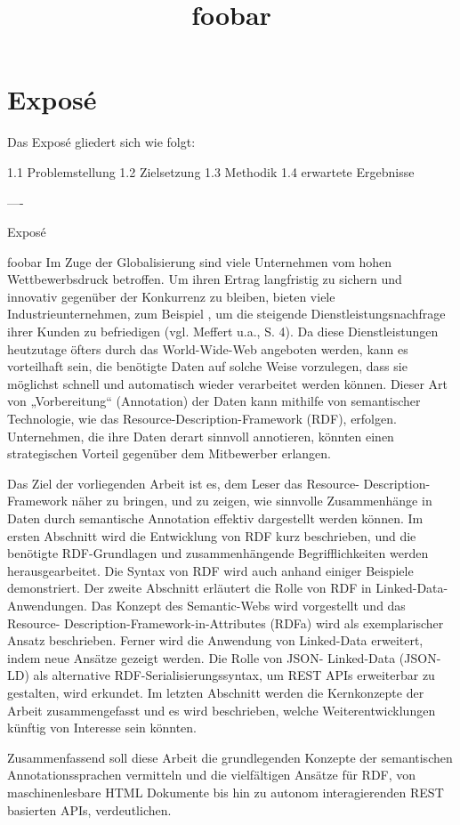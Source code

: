 \documentclass[12pt,
               a4paper,
               twoside=false,
              numbers=noenddot]{scrartcl}
\begin{document}
\title{foobar}
\section{Exposé}
\label{sec:exposé}

Das Exposé gliedert sich wie folgt:  

1.1 Problemstellung
1.2 Zielsetzung
1.3 Methodik
1.4 erwartete Ergebnisse

----

Exposé

\autocite{Wood:14:WNR} foobar
Im Zuge der Globalisierung sind viele Unternehmen vom hohen Wettbewerbsdruck betroffen. Um ihren Ertrag langfristig zu sichern und innovativ gegenüber der Konkurrenz zu bleiben, bieten viele Industrieunternehmen, zum Beispiel , um die steigende Dienstleistungsnachfrage ihrer Kunden zu befriedigen (vgl.
Meffert u.a., S. 4). Da diese Dienstleistungen heutzutage öfters durch das World-Wide-Web angeboten werden, kann es vorteilhaft sein, die benötigte Daten auf solche Weise vorzulegen, dass sie möglichst schnell und automatisch wieder verarbeitet werden können. Dieser Art von „Vorbereitung“ (Annotation) der Daten kann mithilfe von semantischer Technologie, wie das Resource-Description-Framework (RDF), erfolgen. Unternehmen, die ihre Daten derart sinnvoll annotieren, könnten einen strategischen Vorteil gegenüber dem Mitbewerber erlangen.

Das Ziel der vorliegenden Arbeit ist es, dem Leser das Resource- Description-Framework näher zu bringen, und zu zeigen, wie sinnvolle Zusammenhänge in Daten durch semantische Annotation effektiv dargestellt werden können. Im ersten Abschnitt wird die Entwicklung von RDF kurz beschrieben, und die benötigte RDF-Grundlagen und zusammenhängende Begrifflichkeiten werden herausgearbeitet. Die Syntax von RDF wird auch anhand einiger Beispiele demonstriert. Der zweite Abschnitt erläutert die Rolle von RDF in Linked-Data-Anwendungen. Das Konzept des Semantic-Webs wird vorgestellt und das Resource- Description-Framework-in-Attributes (RDFa) wird als exemplarischer Ansatz beschrieben. Ferner wird die Anwendung von Linked-Data erweitert, indem neue Ansätze gezeigt werden. Die Rolle von JSON- Linked-Data (JSON-LD) als alternative RDF-Serialisierungssyntax, um REST APIs erweiterbar zu gestalten, wird erkundet. Im letzten Abschnitt werden die Kernkonzepte der Arbeit zusammengefasst und es wird beschrieben, welche Weiterentwicklungen künftig von Interesse sein könnten.

Zusammenfassend soll diese Arbeit die grundlegenden Konzepte der semantischen Annotationssprachen vermitteln und die vielfältigen Ansätze für RDF, von maschinenlesbare HTML Dokumente bis hin zu autonom interagierenden REST basierten APIs, verdeutlichen.


\printbibliography[heading=bibintoc]	
\end{document}
